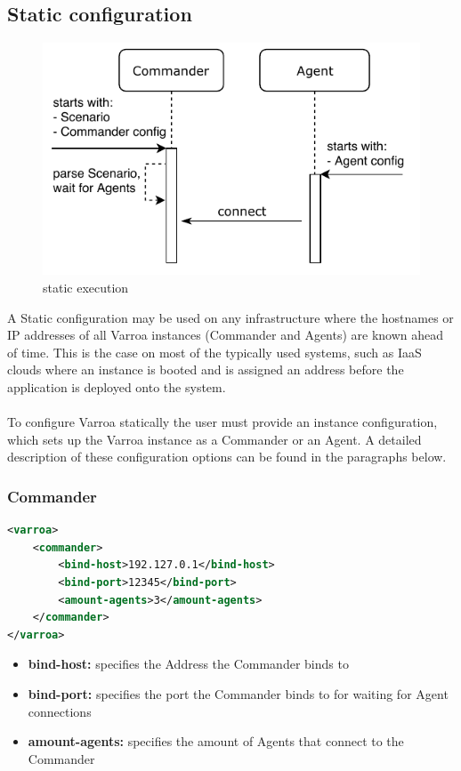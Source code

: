 \subsection{Static configuration}
\begin{figure}[h]
\begin{center}
\includegraphics[scale=1]{Resources/PDF/ExecutionStaticInit}
\caption{static execution}
\label{pic:staticExecution}
\end{center}
\end{figure}

A Static configuration may be used on any infrastructure where the hostnames or IP addresses of all Varroa instances (Commander and Agents) are known ahead of time. This is the case on most of the typically used systems, such as IaaS clouds where an instance is booted and is assigned an address before the application is deployed onto the system.\\
\\
To configure Varroa statically the user must provide an instance configuration, which sets up the Varroa instance as a Commander or an Agent.
A detailed description of these configuration options can be found in the paragraphs below.

\subsubsection{Commander}\label{sec:commanderConfig}
\begin{lstlisting}[caption={Commander XML configuration example}, captionpos=b, label={lst:commanderConfig}, language=XML]
<varroa>
    <commander>
		<bind-host>192.127.0.1</bind-host>
        <bind-port>12345</bind-port>
        <amount-agents>3</amount-agents>
    </commander>
</varroa>
\end{lstlisting}
\begin{itemize}
	\item \textbf{bind-host:} specifies the Address the Commander binds to
	\item \textbf{bind-port:} specifies the port the Commander binds to for waiting for Agent connections
	\item \textbf{amount-agents:} specifies the amount of Agents that connect to the Commander
\end{itemize}

